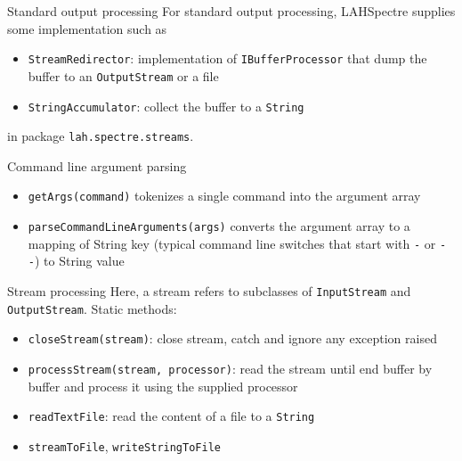 \documentclass{beamer}
\begin{document}
\begin{frame}[fragile]{Standard output processing}
For standard output processing, LAHSpectre supplies some implementation such as
\begin{itemize}
\item \verb/StreamRedirector/: implementation of \verb/IBufferProcessor/ that dump the buffer to an \verb/OutputStream/ or a file
\item \verb/StringAccumulator/:  collect the buffer to a \verb/String/
\end{itemize}
in package \verb/lah.spectre.streams/.
\end{frame}

\begin{frame}[fragile]{Command line argument parsing}
\begin{itemize}
\item \verb/getArgs(command)/ tokenizes a single command into the argument array
\item \verb/parseCommandLineArguments(args)/ converts the argument array to a mapping of String key (typical command line switches that start with \verb/-/ or \verb/--/) to String value
\end{itemize}
\end{frame}

\begin{frame}[fragile]{Stream processing}
Here, a stream refers to subclasses of \verb/InputStream/ and \verb/OutputStream/. Static methods:
\begin{itemize}
\item \verb/closeStream(stream)/: close stream, catch and ignore any exception raised
\item \verb/processStream(stream, processor)/: read the stream until end buffer by buffer and process it using the supplied processor
\item \verb/readTextFile/: read the content of a file to a \verb/String/
\item \verb/streamToFile/, \verb/writeStringToFile/
\end{itemize}
\end{frame}
\end{document}
